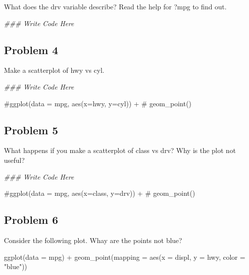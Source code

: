 \documentclass[
  letterpaper,
  DIV=11,
  numbers=noendperiod]{scrreprt}
\newenvironment{Shaded}{\begin{snugshade}}{\end{snugshade}}
\newcommand{\AttributeTok}[1]{\textcolor[rgb]{0.40,0.45,0.13}{#1}}
\newcommand{\CommentTok}[1]{\textcolor[rgb]{0.37,0.37,0.37}{#1}}
\newcommand{\DocumentationTok}[1]{\textcolor[rgb]{0.37,0.37,0.37}{\textit{#1}}}
\newcommand{\FunctionTok}[1]{\textcolor[rgb]{0.28,0.35,0.67}{#1}}
\newcommand{\NormalTok}[1]{\textcolor[rgb]{0.00,0.23,0.31}{#1}}
\newcommand{\SpecialCharTok}[1]{\textcolor[rgb]{0.37,0.37,0.37}{#1}}
\newcommand{\StringTok}[1]{\textcolor[rgb]{0.13,0.47,0.30}{#1}}
\begin{document}
What does the drv variable describe? Read the help for ?mpg to find out.

\begin{Shaded}
\begin{Highlighting}[]
\DocumentationTok{\#\#\# Write Code Here}
\end{Highlighting}
\end{Shaded}

\subsection*{Problem 4}\label{problem-4-1}

Make a scatterplot of hwy vs cyl.

\begin{Shaded}
\begin{Highlighting}[]
\DocumentationTok{\#\#\# Write Code Here}

\CommentTok{\#ggplot(data = mpg, aes(x=hwy, y=cyl)) +}
\CommentTok{\#  geom\_point()}
\end{Highlighting}
\end{Shaded}

\subsection*{Problem 5}\label{problem-5-1}

What happens if you make a scatterplot of class vs drv? Why is the plot
not useful?

\begin{Shaded}
\begin{Highlighting}[]
\DocumentationTok{\#\#\# Write Code Here}

\CommentTok{\#ggplot(data = mpg, aes(x=class, y=drv)) +}
\CommentTok{\#  geom\_point()}
\end{Highlighting}
\end{Shaded}

\subsection*{Problem 6}\label{problem-6-1}

Consider the following plot. Whay are the points not blue?

\begin{Shaded}
\begin{Highlighting}[]
\FunctionTok{ggplot}\NormalTok{(}\AttributeTok{data =}\NormalTok{ mpg) }\SpecialCharTok{+} 
  \FunctionTok{geom\_point}\NormalTok{(}\AttributeTok{mapping =} \FunctionTok{aes}\NormalTok{(}\AttributeTok{x =}\NormalTok{ displ, }\AttributeTok{y =}\NormalTok{ hwy, }\AttributeTok{color =} \StringTok{"blue"}\NormalTok{))}
\end{Highlighting}
\end{Shaded}
\end{document}
